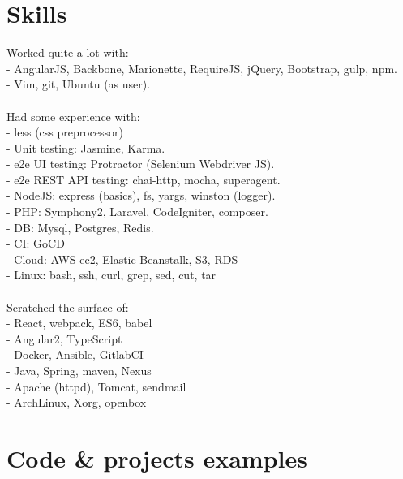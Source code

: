 \documentclass[a4paper, 14pt]{article}
\begin{document}
\section{Skills}
    Worked quite a lot with: \\
    - AngularJS, Backbone, Marionette, RequireJS, jQuery, Bootstrap, gulp, npm. \\
    - Vim, git, Ubuntu (as user). \\
    \\
    Had some experience with: \\
    - less (css preprocessor) \\
    - Unit testing: Jasmine, Karma. \\
    - e2e UI testing: Protractor (Selenium Webdriver JS). \\
    - e2e REST API testing: chai-http, mocha, superagent. \\
    - NodeJS: express (basics), fs, yargs, winston (logger). \\
    - PHP: Symphony2, Laravel, CodeIgniter, composer. \\
    - DB: Mysql, Postgres, Redis. \\
    - CI: GoCD \\
    - Cloud: AWS ec2, Elastic Beanstalk, S3, RDS \\
    - Linux: bash, ssh, curl, grep, sed, cut, tar \\
    \\
    Scratched the surface of: \\
    - React, webpack, ES6, babel \\
    - Angular2, TypeScript \\
    - Docker, Ansible, GitlabCI \\
    - Java, Spring, maven, Nexus \\
    - Apache (httpd), Tomcat, sendmail \\
    - ArchLinux, Xorg, openbox \\

\section{Code \& projects examples}
\end{document}
